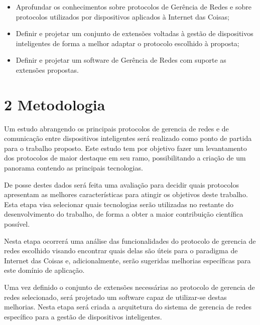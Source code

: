 \documentclass[twoside,english,brazilian]{UNISINOSmonografia}
\begin{document}
		\begin{itemize}
			\item 
				Aprofundar os conhecimentos sobre protocolos de Gerência de 
				Redes e sobre protocolos utilizados por dispositivos aplicados 
				à Internet das Coisas;
				
			\item
				Definir e projetar um conjunto de extensões voltadas à gestão 
				de dispositivos inteligentes de forma a melhor adaptar o 
				protocolo escolhido à proposta;
				
			\item
				Definir e projetar um software de Gerência de Redes com 
				suporte as extensões propostas.
				
		\end{itemize}


\chapter{2 Metodologia}

	Um estudo abrangendo os principais protocolos de gerencia de redes e de 
	comunicação entre dispositivos inteligentes será realizado como ponto de 
	partida para o trabalho proposto. Este estudo tem por objetivo fazer um 
	levantamento dos protocolos de maior destaque em seu ramo, possibilitando 
	a criação de um panorama contendo as principais tecnologias.
	
	De posse destes dados será feita uma avaliação para decidir quais 
	protocolos apresentam as melhores características para atingir os 
	objetivos deste trabalho. Esta etapa visa selecionar quais tecnologias 
	serão utilizadas no restante do desenvolvimento do trabalho, de forma a 
	obter a maior contribuição científica possível.
	
	Nesta etapa ocorrerá uma análise das funcionalidades do protocolo de 
	gerencia de redes escolhido visando encontrar quais delas são úteis para o 
	paradigma de Internet das Coisas e, adicionalmente, serão sugeridas 
	melhorias específicas para este domínio de aplicação.
	
	Uma vez definido o conjunto de extensões necessárias ao protocolo de 
	gerencia de redes selecionado, será projetado um software capaz de 
	utilizar-se destas melhorias. Nesta etapa será criada a arquitetura do 
	sistema de gerencia de redes específico para a gestão de dispositivos 
	inteligentes.
	
\end{document}
